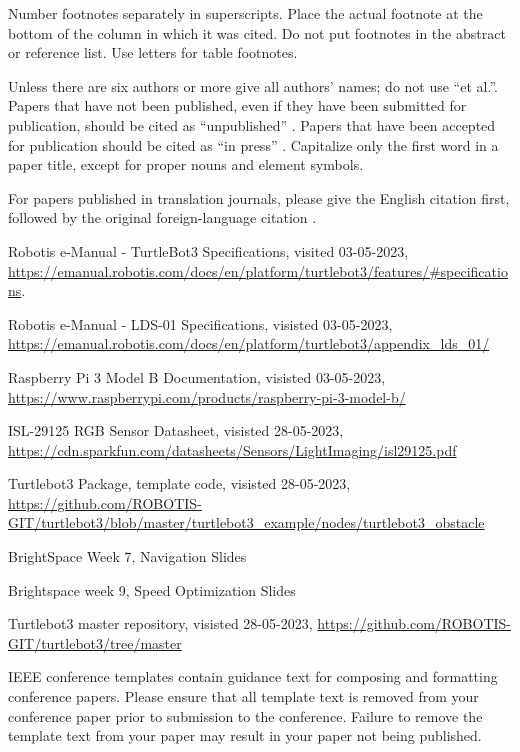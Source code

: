 \documentclass[conference]{IEEEtran}
\begin{document}
Number footnotes separately in superscripts. Place the actual footnote at 
the bottom of the column in which it was cited. Do not put footnotes in the 
abstract or reference list. Use letters for table footnotes.

Unless there are six authors or more give all authors' names; do not use 
``et al.''. Papers that have not been published, even if they have been 
submitted for publication, should be cited as ``unpublished'' \cite{b4}. Papers 
that have been accepted for publication should be cited as ``in press'' \cite{b5}. 
Capitalize only the first word in a paper title, except for proper nouns and 
element symbols.

For papers published in translation journals, please give the English 
citation first, followed by the original foreign-language citation \cite{b6}.

\begin{thebibliography}{00}
 \raggedright Robotis e-Manual - TurtleBot3 Specifications, visited 03-05-2023, \url{https://emanual.robotis.com/docs/en/platform/turtlebot3/features/#specifications}.
 \raggedright Robotis e-Manual - LDS-01 Specifications, visisted 03-05-2023, \url{https://emanual.robotis.com/docs/en/platform/turtlebot3/appendix_lds_01/}
 \raggedright Raspberry Pi 3 Model B Documentation, visisted 03-05-2023, \url{https://www.raspberrypi.com/products/raspberry-pi-3-model-b/}
 \raggedright ISL-29125 RGB Sensor Datasheet, visisted 28-05-2023, \url{https://cdn.sparkfun.com/datasheets/Sensors/LightImaging/isl29125.pdf}
 \raggedright Turtlebot3 Package, template code, visisted 28-05-2023, \url{https://github.com/ROBOTIS-GIT/turtlebot3/blob/master/turtlebot3_example/nodes/turtlebot3_obstacle}
 \raggedright BrightSpace Week 7, Navigation Slides
 \raggedright Brightspace week 9, Speed Optimization Slides
 \raggedright Turtlebot3 master repository, visisted 28-05-2023, \url{https://github.com/ROBOTIS-GIT/turtlebot3/tree/master}

\end{thebibliography}
\vspace{12pt}
\color{red}
IEEE conference templates contain guidance text for composing and formatting conference papers. Please ensure that all template text is removed from your conference paper prior to submission to the conference. Failure to remove the template text from your paper may result in your paper not being published.
\end{document}
